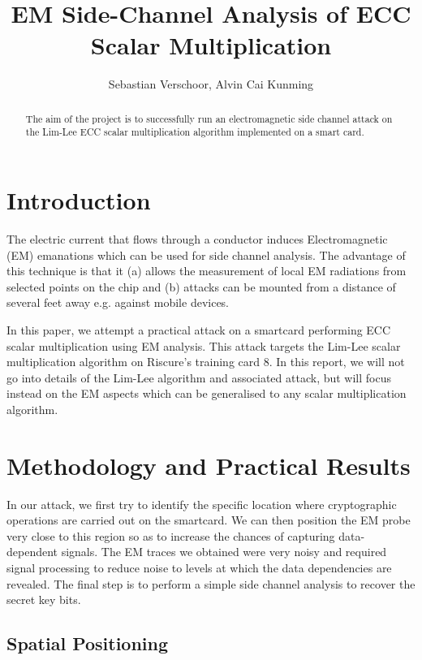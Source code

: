\documentclass{llncs}
\begin{document}
\title{EM Side-Channel Analysis of ECC Scalar Multiplication}
\author{Sebastian Verschoor, Alvin Cai Kunming}
\maketitle
%
\begin{abstract}
The aim of the project is to successfully run an electromagnetic side channel attack on the Lim-Lee ECC scalar multiplication algorithm implemented on a smart card. 
\end{abstract} 
%
\section{Introduction}

The electric current that flows through a conductor induces Electromagnetic (EM) emanations which can be used for side channel analysis. The advantage of this technique is that it (a) allows the measurement of local EM radiations from selected points on the chip \cite{Gandolfi} and (b) attacks can be mounted from a distance of several feet away \cite{cri} e.g. against mobile devices.

In this paper, we attempt a practical attack on a smartcard performing ECC scalar multiplication using EM analysis. This attack targets the Lim-Lee scalar multiplication algorithm on Riscure's training card 8. In this report, we will not go into details of the Lim-Lee algorithm and associated attack, but will focus instead on the EM aspects which can be generalised to any scalar multiplication algorithm.

\section{Methodology and Practical Results}

In our attack, we first try to identify the specific location where cryptographic operations are carried out on the smartcard. We can then position the EM probe very close to this region so as to increase the chances of capturing data-dependent signals. The EM traces we obtained were very noisy and required signal processing to reduce noise to levels at which the data dependencies are revealed. The final step is to perform a simple side channel analysis to recover the secret key bits.

\subsection{Spatial Positioning}
\end{document}
